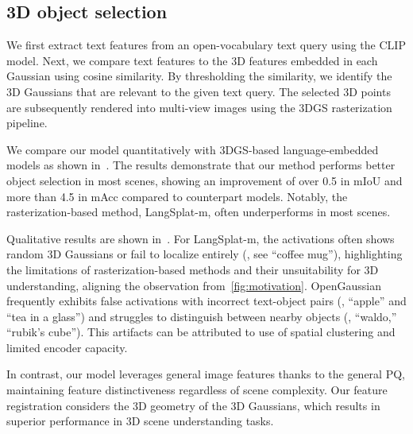 \subsection{3D object selection}
\label{subsec:5_1}

We first extract text features from an open-vocabulary text query using the CLIP model. Next, we compare text features to the 3D features embedded in each Gaussian using cosine similarity. By thresholding the similarity, we identify the 3D Gaussians that are relevant to the given text query. The selected 3D points are subsequently rendered into multi-view images using the 3DGS rasterization pipeline. 

We compare our model quantitatively with 3DGS-based language-embedded models as shown in~. 
The results demonstrate that our method performs better object selection in most scenes, showing an improvement of over 0.5 in mIoU and more than 4.5 in mAcc compared to counterpart models. Notably, the rasterization-based method, LangSplat-m, often underperforms in most scenes.

Qualitative results are shown in~. 
For LangSplat-m, the activations often shows random 3D Gaussians or fail to localize entirely (\eg, see ``coffee mug''), highlighting the limitations of rasterization-based methods and their unsuitability for 3D understanding, aligning the observation from~\cref{fig:motivation}. OpenGaussian frequently exhibits false activations with incorrect text-object pairs (\eg, ``apple'' and ``tea in a glass'') and struggles to distinguish between nearby objects (\eg, ``waldo,'' ``rubik's cube'').
This artifacts can be attributed to use of spatial clustering and limited encoder capacity.

In contrast, our model leverages general image features thanks to the general PQ, maintaining feature distinctiveness regardless of scene complexity.
Our feature registration considers the 3D geometry of the 3D Gaussians, which results in superior performance in 3D scene understanding tasks.

